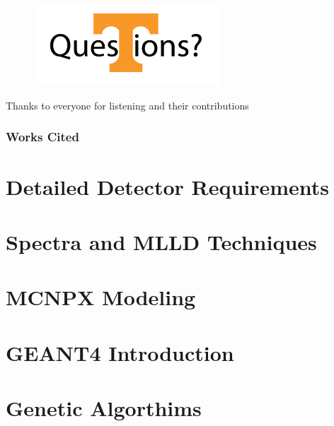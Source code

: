 \documentclass[compress]{beamer}
\begin{document}
\begin{frame}{}
  \centering
  \begin{figure}
    \includegraphics[height=3cm]{PowerTQuestion.png}
  \end{figure}
  Thanks to everyone for listening and their contributions
\end{frame}
\begin{frame}
\frametitle{Works Cited}
	\tiny
\end{frame}
\appendix
\section*{Detailed Detector Requirements}
\label{PNNLCriteria}

\section*{Spectra and MLLD Techniques}
\label{MeasMethods}

\section*{MCNPX Modeling}
\label{MCNPXMethodExtended}

\section*{GEANT4 Introduction}
\label{G4Intro}

\section*{Genetic Algorthims}
\label{GAMethodExtended}

\end{document}
